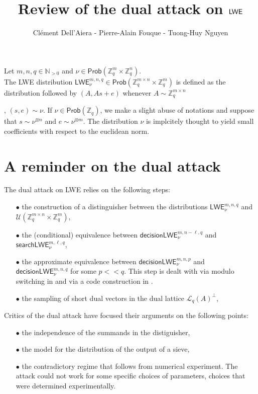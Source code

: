 \documentclass{article}
\title{Review of the dual attack on $\LWE$}
\author{Clément Dell'Aiera - Pierre-Alain Fouque - Tuong-Huy Nguyen}
\newif\ifshowcomments
\DeclareRobustCommand{\TN}[1]{%
  \ifshowcomments
    {\color{orange} [TN][#1]}%
  \fi
}
\newcommand{\NN}{\mathbb{N}}
\newcommand{\ZZ}{\mathbb{Z}}
\newcommand{\Prob}{\mathsf{Prob}}
\newcommand{\LL}{\mathcal{L}}
\newcommand{\U}{\mathcal{U}}
\newcommand{\LWE}{\mathsf{LWE}}
\newcommand{\dLWE}{\mathsf{decisionLWE}}
\newcommand{\sLWE}{\mathsf{searchLWE}}
\begin{document}
\maketitle
\TN{J'ai remplacé ComputationalLWE par searchLWE, car c'est le terme usuel.}
Let $m,n,q\in\NN_{>0}$ and $\nu\in \Prob (\ZZ_q^m \times \ZZ_q^n )$.\\

The LWE distribution $\LWE^{m,n,q}_\nu \in \Prob(\ZZ_q^{m\times n} \times \ZZ_q^{m})$ is defined as the distribution followed by $(A,As+ e )$ whenever $A\sim \ZZ_q^{m\times n }$ \TN{Est-ce que ce n'est pas $\mathcal{U}(\ZZ_q^{m\times n })$ ?}, $(s,e)\sim \nu$. If $\nu\in\Prob(\ZZ_q)$, we make a slight abuse of notations and suppose that $s\sim \nu^{\otimes n}$ and $e\sim \nu^{\otimes m}$. The distribution $\nu$ is implcitely thought to yield small coefficients with respect to the euclidean norm.

\section{A reminder on the dual attack}

The dual attack on LWE relies on the following steps:
\begin{itemize}
	\item[$\bullet$] the construction of a distinguisher between the distributions $\LWE^{m,n,q}_\nu$ and $\U(\ZZ_q^{m\times n} \times \ZZ_q^{m})$,
	\item[$\bullet$] the (conditional) equivalence between $\dLWE^{m,n - \ell,q}_\nu$ and $\sLWE_\nu^{m,\ell,q}$, \TN{Que signifie conditional ?}
	\item[$\bullet$] the approximate equivalence between $\dLWE^{m,n,p}_\nu$ and $\dLWE^{m,n,q}_\nu$ for some $p<<q$. This step is dealt with via modulo switching in \cite{Matzov} and via a code construction in \cite{carrier2024reduction}.
	\item[$\bullet$] the sampling of short dual vectors in the dual lattice $\LL_q(A)^\perp$,
\end{itemize}

Critics of the dual attack have focused their arguments on the following points:
\begin{itemize}
\item[$\bullet$] the independence of the summands in the distiguisher,
\item[$\bullet$] the model for the distribution of the output of a sieve, \TN{Il faudrait préciser où intervient le sieve et donc la modélisation de l'output dans les étapes introduites avant.}
\item[$\bullet$] the contradictory regime that follows from numerical experiment. The attack could not work for some specific choices of parameters, choices that were determined experimentally. \TN{Je trouve que c'est mal dit, ou en tout cas, cela ne fit pas bien avec les points d'avant.}
\end{itemize}
\end{document}
